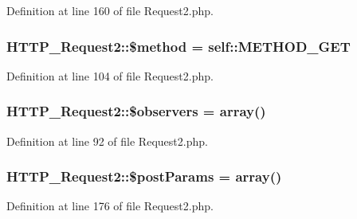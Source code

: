 Definition at line 160 of file Request2.\+php.

\hypertarget{classHTTP__Request2_ae83c79d14f1b596d91b60862ea1370af}{}
\subsubsection[{\$method}]{\setlength{\rightskip}{0pt plus 5cm}H\+T\+T\+P\+\_\+\+Request2\+::\$method = self\+::\+M\+E\+T\+H\+O\+D\+\_\+\+G\+E\+T\hspace{0.3cm}{\ttfamily [protected]}}\label{classHTTP__Request2_ae83c79d14f1b596d91b60862ea1370af}


Definition at line 104 of file Request2.\+php.

\hypertarget{classHTTP__Request2_ab57c87d4bee6cb35be6b976a8ec7ec2f}{}
\subsubsection[{\$observers}]{\setlength{\rightskip}{0pt plus 5cm}H\+T\+T\+P\+\_\+\+Request2\+::\$observers = array()\hspace{0.3cm}{\ttfamily [protected]}}\label{classHTTP__Request2_ab57c87d4bee6cb35be6b976a8ec7ec2f}


Definition at line 92 of file Request2.\+php.

\hypertarget{classHTTP__Request2_a77aa571439401e1cd2adc407f4bdc222}{}
\subsubsection[{\$post\+Params}]{\setlength{\rightskip}{0pt plus 5cm}H\+T\+T\+P\+\_\+\+Request2\+::\$post\+Params = array()\hspace{0.3cm}{\ttfamily [protected]}}\label{classHTTP__Request2_a77aa571439401e1cd2adc407f4bdc222}


Definition at line 176 of file Request2.\+php.

\hypertarget{classHTTP__Request2_ad95bfff299ff890d4f554754428337e5}{}

